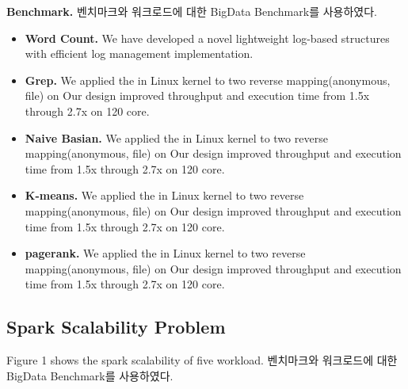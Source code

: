 \fi

\ifkor
\noindent
\textbf{Benchmark.} 벤치마크와 워크로드에 대한 BigData Benchmark를 사용하였다.
\begin{itemize}
\item \textbf{Word Count. }We have developed a novel lightweight log-based
structures with efficient log management implementation.
\item \textbf{Grep. }
We applied the in Linux kernel to two reverse mapping(anonymous, file) on
Our design improved throughput and execution time from 1.5x through 2.7x on 120 core.
\item \textbf{Naive Basian. }
We applied the in Linux kernel to two reverse mapping(anonymous, file) on
Our design improved throughput and execution time from 1.5x through 2.7x on 120 core.
\item \textbf{K-means. }
We applied the in Linux kernel to two reverse mapping(anonymous, file) on
Our design improved throughput and execution time from 1.5x through 2.7x on 120 core.
\item \textbf{pagerank. }
We applied the in Linux kernel to two reverse mapping(anonymous, file) on
Our design improved throughput and execution time from 1.5x through 2.7x on 120 core.
\end{itemize}


\else

\fi

\subsection{Spark Scalability Problem}


\ifkor
Figure 1 shows the spark scalability of five workload.
벤치마크와 워크로드에 대한 BigData Benchmark를 사용하였다.
\else

\fi



